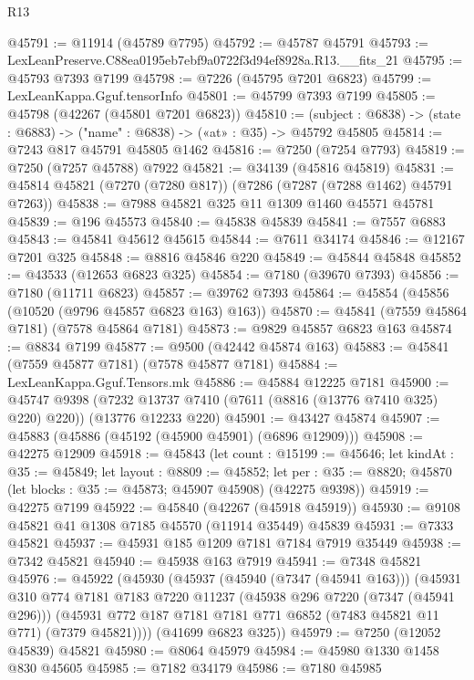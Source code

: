 \begin{lexlean}{R13}
\begin{coremodule}
@45791 := @11914 (@45789 @7795)
@45792 := @45787 @45791
@45793 := LexLeanPreserve.C88ea0195eb7ebf9a0722f3d94ef8928a.R13.__fits_21
@45795 := @45793 @7393 @7199
@45798 := @7226 (@45795 @7201 @6823)
@45799 := LexLeanKappa.Gguf.tensorInfo
@45801 := @45799 @7393 @7199
@45805 := @45798 (@42267 (@45801 @7201 @6823))
@45810 := (subject : @6838) -> (state : @6883) -> ("name" : @6838) -> («at» : @35) -> @45792 @45805
@45814 := @7243 @817 @45791 @45805 @1462
@45816 := @7250 (@7254 @7793)
@45819 := @7250 (@7257 @45788) @7922
@45821 := @34139 (@45816 @45819)
@45831 := @45814 @45821 (@7270 (@7280 @817)) (@7286 (@7287 (@7288 @1462) @45791 @7263))
@45838 := @7988 @45821 @325 @11 @1309 @1460 @45571 @45781
@45839 := @196 @45573
@45840 := @45838 @45839
@45841 := @7557 @6883
@45843 := @45841 @45612 @45615
@45844 := @7611 @34174
@45846 := @12167 @7201 @325
@45848 := @8816 @45846 @220
@45849 := @45844 @45848
@45852 := @43533 (@12653 @6823 @325)
@45854 := @7180 (@39670 @7393)
@45856 := @7180 (@11711 @6823)
@45857 := @39762 @7393
@45864 := @45854 (@45856 (@10520 (@9796 @45857 @6823 @163) @163))
@45870 := @45841 (@7559 @45864 @7181) (@7578 @45864 @7181)
@45873 := @9829 @45857 @6823 @163
@45874 := @8834 @7199
@45877 := @9500 (@42442 @45874 @163)
@45883 := @45841 (@7559 @45877 @7181) (@7578 @45877 @7181)
@45884 := LexLeanKappa.Gguf.Tensors.mk
@45886 := @45884 @12225 @7181
@45900 := @45747
    @9398
    (@7232 @13737 @7410 (@7611 (@8816 (@13776 @7410 @325) @220) @220))
    (@13776 @12233 @220)
@45901 := @43427 @45874
@45907 := @45883 (@45886 (@45192 (@45900 @45901) (@6896 @12909)))
@45908 := @42275 @12909
@45918 := @45843
    (let count : @15199 := @45646;
    let kindAt : @35 := @45849;
    let layout : @8809 := @45852;
    let per : @35 := @8820; @45870 (let blocks : @35 := @45873; @45907 @45908) (@42275 @9398))
@45919 := @42275 @7199
@45922 := @45840 (@42267 (@45918 @45919))
@45930 := @9108 @45821 @41 @1308 @7185 @45570 (@11914 @35449) @45839
@45931 := @7333 @45821
@45937 := @45931 @185 @1209 @7181 @7184 @7919 @35449
@45938 := @7342 @45821
@45940 := @45938 @163 @7919
@45941 := @7348 @45821
@45976 := @45922
    (@45930
      (@45937
        (@45940 (@7347 (@45941 @163)))
        (@45931
          @310
          @774
          @7181
          @7183
          @7220
          @11237
          (@45938 @296 @7220 (@7347 (@45941 @296)))
          (@45931 @772 @187 @7181 @7181 @771 @6852 (@7483 @45821 @11 @771) (@7379 @45821))))
      (@41699 @6823 @325))
@45979 := @7250 (@12052 @45839) @45821
@45980 := @8064 @45979
@45984 := @45980 @1330 @1458 @830 @45605
@45985 := @7182 @34179
@45986 := @7180 @45985

\end{coremodule}
\end{lexlean}

